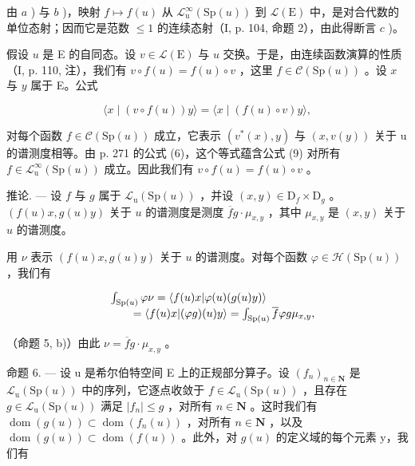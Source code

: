 由 \(a\) ) 与 \(b\) )，映射 \(f \mapsto f(u)\) 从 \(\mathcal{L}_{\mathrm{u}}^{\infty}(\mathrm{Sp}(u))\) 到 \(\mathcal{L}(\mathrm{E})\) 中，是对合代数的单位态射；因而它是范数 \(\leqslant 1\) 的连续态射（I, p. 104, 命题 2），由此得断言 \(c\) )。

假设 \(u\) 是 E 的自同态。设 \(v \in \mathcal{L}(\mathrm{E})\) 与 \(u\) 交换。于是，由连续函数演算的性质（I, p. 110, 注），我们有 \(v \circ f(u) = f(u) \circ v\) ，这里 \(f \in \mathcal{C}(\mathrm{Sp}(u))\) 。设 \(x\) 与 \(y\) 属于 E。公式

\[
\langle x \mid (v \circ f (u)) y \rangle = \langle x \mid (f (u) \circ v) y \rangle ,\tag{9}
\]

对每个函数 \(f \in \mathcal{C}(\mathrm{Sp}(u))\) 成立，它表示 \((v^{*}(x), y)\) 与 \((x, v(y))\) 关于 u 的谱测度相等。由 p. 271 的公式 (6)，这个等式蕴含公式 (9) 对所有 \(f \in \mathcal{L}_{\mathrm{u}}^{\infty}(\mathrm{Sp}(u))\) 成立。因此我们有 \(v \circ f(u) = f(u) \circ v\) 。

推论. --- 设 \(f\) 与 \(g\) 属于 \(\mathcal{L}_{\mathrm{u}}(\mathrm{Sp}(u))\) ，并设 \((x,y)\in\mathrm{D}_{f}\times\mathrm{D}_{g}\) 。\((f(u)x,g(u)y)\) 关于 \(u\) 的谱测度是测度 \(\overline{f}g\cdot\mu_{x,y}\) ，其中 \(\mu_{x,y}\) 是 \((x,y)\) 关于 \(u\) 的谱测度。

用 \(\nu\) 表示 \((f(u)x,g(u)y)\) 关于 \(u\) 的谱测度。对每个函数 \(\varphi \in \mathcal{H}(\mathrm{Sp}(u))\) ，我们有

\[
\begin{array}{r l} & {\int_ {\mathrm{Sp} (u)} \varphi \nu = \langle f (u) x | \varphi (u) (g (u) y) \rangle} \\ & {\qquad = \langle f (u) x | (\varphi g) (u) y \rangle = \int_ {\mathrm{Sp} (u)} \overline {{f}} \varphi g \mu_ {x, y},} \end{array}
\]

（命题 5, b)）由此 \(\nu = \overline{f} g \cdot \mu_{x,y}\) 。

命题 6. --- 设 u 是希尔伯特空间 E 上的正规部分算子。设 \((f_n)_{n \in \mathbf{N}}\) 是 \(\mathcal{L}_{\mathrm{u}}(\mathrm{Sp}(u))\) 中的序列，它逐点收敛于 \(f \in \mathcal{L}_{\mathrm{u}}(\mathrm{Sp}(u))\) ，且存在 \(g \in \mathcal{L}_{\mathrm{u}}(\mathrm{Sp}(u))\) 满足 \(|f_n| \leqslant g\) ，对所有 \(n \in \mathbf{N}\) 。这时我们有 \(\operatorname{dom}(g(u)) \subset \operatorname{dom}(f_n(u))\) ，对所有 \(n \in \mathbf{N}\) ，以及 \(\operatorname{dom}(g(u)) \subset \operatorname{dom}(f(u))\) 。此外，对 \(g(u)\) 的定义域的每个元素 y，我们有

